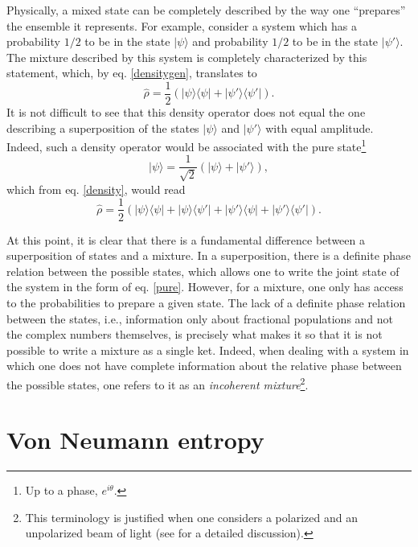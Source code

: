 \documentclass[
12pt,		%
openright,	%
twoside,  %
a4paper,			%
chapter=TITLE,		%
english,			%
french,				%
spanish,			%
brazil				%
]{USPSC-classe/USPSC}
\begin{document}
\begin{apendicesenv}
Physically, a mixed state can be completely described by the way one ``prepares'' the ensemble it represents. For example, consider a system which has a probability $1/2$ to be in the state $|\psi\rangle$ and probability $1/2$ to be in the state $|\psi'\rangle$. The mixture described by this system is completely characterized by this statement, which, by eq. \ref{densitygen}, translates to
\begin{equation}\label{0001}
    \hat{\rho}=\frac{1}{2}(|\psi\rangle\langle\psi|+|\psi'\rangle\langle\psi'|).
\end{equation}
It is not difficult to see that this density operator does not equal the one describing a superposition of the states $|\psi\rangle$ and $|\psi'\rangle$ with equal amplitude. Indeed, such a density operator would be associated with the pure state\footnote{Up to a phase, $e^{i\theta}$.}
\begin{equation}
    |\psi\rangle=\frac{1}{\sqrt{2}}\left(|\psi\rangle+|\psi'\rangle\right),
\end{equation}
which from eq. \ref{density}, would read
\begin{equation}
     \hat{\rho}=\frac{1}{2}(|\psi\rangle\langle\psi|+|\psi\rangle\langle\psi'|+|\psi'\rangle\langle\psi|+|\psi'\rangle\langle\psi'|).
\end{equation}

At this point, it is clear that there is a fundamental difference between a superposition of states and a mixture. In a superposition, there is a definite phase relation between the possible states, which allows one to write the joint state of the system in the form of eq. \ref{pure}. However, for a mixture, one only has access to the probabilities to prepare a given state. The lack of a definite phase relation between the states, i.e., information only about fractional populations and not the complex numbers themselves, is precisely what makes it so that it is not possible to write a mixture as a single ket. Indeed, when dealing with a system in which one does not have complete information about the relative phase between the possible states, one refers to it as an \textit{incoherent mixture}\footnote{This terminology is justified when one considers a polarized and an unpolarized beam of light (see \cite{Sakurai1994} for a detailed discussion).}. 

\section{Von Neumann entropy}\label{von}


\end{apendicesenv}
\end{document}
